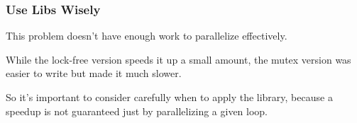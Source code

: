 \begin{frame}
\frametitle{Use Libs Wisely}

 This problem doesn't have enough work to parallelize effectively. 
 
 While the lock-free version speeds it up a small amount, the mutex version was easier to write but made it much slower. 
 
 So it's important to consider carefully when to apply the library, because a speedup is not guaranteed just by parallelizing a given loop.


\end{frame}





